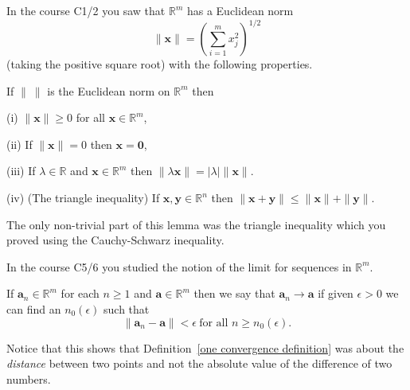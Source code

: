 In the course C1/2 you saw that ${\mathbb R}^{m}$  has
a  Euclidean norm
\[\|{\mathbf x}\|=\left(\sum_{i=1}^{m}x_{j}^{2}\right)^{1/2}\]
(taking the positive square root) with the
following properties.
\begin{lemma}\label{Euclidean norm}
If $\|\ \|$ is the Euclidean norm on 
${\mathbb R}^{m}$  then

(i) $\|{\mathbf x}\|\geq 0$ for all ${\mathbf x}\in{\mathbb R}^{m}$,

(ii) If  $\|{\mathbf x}\|= 0$ then ${\mathbf x}={\mathbf 0}$,

(iii) If $\lambda\in{\mathbb R}$ and ${\mathbf x}\in{\mathbb R}^{m}$
then $\|\lambda {\mathbf x}\|=|\lambda|\|{\mathbf x}\|$.

(iv) (The triangle inequality)
If  ${\mathbf x},{\mathbf y}\in{\mathbb R}^{n}$
then $\|{\mathbf x}+{\mathbf y}\|
\leq\|{\mathbf x}\|+\|{\mathbf y}\|$.
\end{lemma}
The only non-trivial part of this lemma was the triangle inequality
which you proved using the Cauchy-Schwarz inequality.

In the course C5/6 you studied the notion of the
limit for sequences in ${\mathbb R}^{m}$.
\begin{definition}\label{many convergence definition}
If $\mathbf{a}_{n}\in{\mathbb R}^{m}$ for each $n\geq 1$
and $\mathbf{a}\in{\mathbb R}^{m}$ then we say that 
$\mathbf{a}_{n}\rightarrow \mathbf{a}$
if given $\epsilon>0$ we can find an $n_{0}(\epsilon)$
such that
\[\|\mathbf{a}_{n}-\mathbf{a}\|<\epsilon
\ \text{for all $n\geq n_{0}(\epsilon)$}.\]
\end{definition}
Notice that this shows that Definition~\ref{one convergence definition}
was about the \emph{distance} between two points and not
the absolute value of the difference of two numbers.

